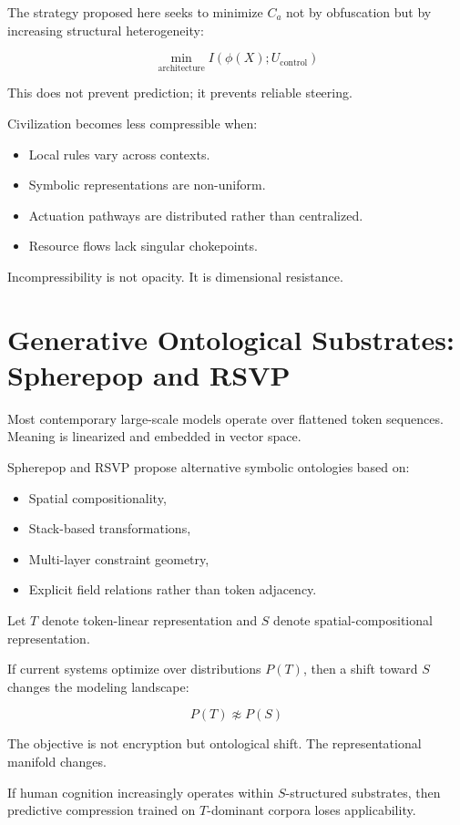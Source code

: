 \documentclass[12pt]{article}
\begin{document}
The strategy proposed here seeks to minimize $C_a$ not by obfuscation but by increasing structural heterogeneity:

\[
\min_{\text{architecture}} I(\phi(X); U_{\text{control}})
\]

This does not prevent prediction; it prevents reliable steering.

Civilization becomes less compressible when:

\begin{itemize}
\item Local rules vary across contexts.
\item Symbolic representations are non-uniform.
\item Actuation pathways are distributed rather than centralized.
\item Resource flows lack singular chokepoints.
\end{itemize}

Incompressibility is not opacity. It is dimensional resistance.

\section{Generative Ontological Substrates: Spherepop and RSVP}

Most contemporary large-scale models operate over flattened token sequences. Meaning is linearized and embedded in vector space.

Spherepop and RSVP propose alternative symbolic ontologies based on:

\begin{itemize}
\item Spatial compositionality,
\item Stack-based transformations,
\item Multi-layer constraint geometry,
\item Explicit field relations rather than token adjacency.
\end{itemize}

Let $T$ denote token-linear representation and $S$ denote spatial-compositional representation.

If current systems optimize over distributions $P(T)$, then a shift toward $S$ changes the modeling landscape:

\[
P(T) \not\approx P(S)
\]

The objective is not encryption but ontological shift. The representational manifold changes.

If human cognition increasingly operates within $S$-structured substrates, then predictive compression trained on $T$-dominant corpora loses applicability.
\end{document}
